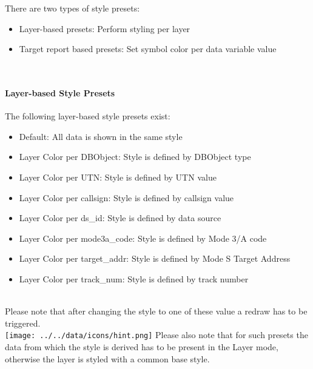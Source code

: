 There are two types of style presets:
\begin{itemize}
 \item Layer-based presets: Perform styling per layer
 \item Target report based presets: Set symbol color per data variable value
\end{itemize}
\  \\

\paragraph{Layer-based Style Presets}
The following layer-based style presets exist:
\begin{itemize}
 \item Default: All data is shown in the same style
 \item Layer Color per DBObject: Style is defined by DBObject type
 \item Layer Color per UTN: Style is defined by UTN value
 \item Layer Color per callsign: Style is defined by callsign value
 \item Layer Color per ds\_id: Style is defined by data source
 \item Layer Color per mode3a\_code: Style is defined by Mode 3/A code
 \item Layer Color per target\_addr: Style is defined by Mode S Target Address
 \item Layer Color per track\_num: Style is defined by track number
\end{itemize}
\  \\

Please note that after changing the style to one of these value a redraw has to be triggered. \\

\texttt{[image: ../../data/icons/hint.png]} Please also note that for such presets the data from which the style is derived has to be present in the Layer mode, otherwise the layer is styled with a common base style.

